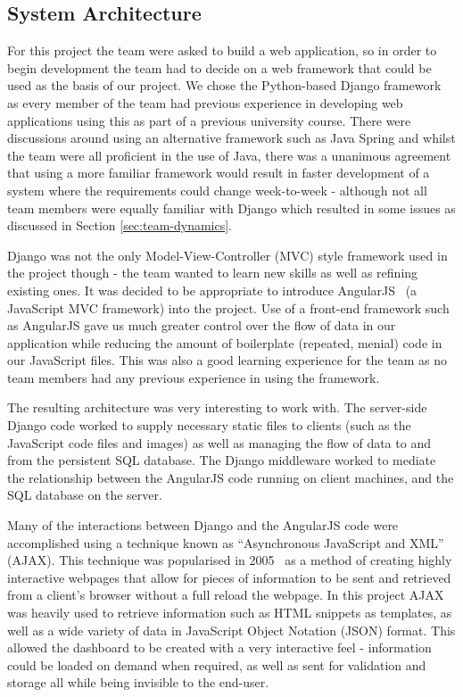 \documentclass{l3proj}
\begin{document}
\subsection{System Architecture}
\label{sec:system-implementation:system-architecture}

For this project the team were asked to build a web application, so in order to begin development the team had to decide on a web framework that could be used as the basis of our project. We chose the Python-based Django framework~\cite{Django} as every member of the team had previous experience in developing web applications using this as part of a previous university course. There were discussions around using an alternative framework such as Java Spring and whilst the team were all proficient in the use of Java, there was a unanimous agreement that using a more familiar framework would result in faster development of a system where the requirements could change week-to-week - although not all team members were equally familiar with Django which resulted in some issues as discussed in Section \ref{sec:team-dynamics}.

Django was not the only Model-View-Controller (MVC) style framework used in the project though - the team wanted to learn new skills as well as refining existing ones. It was decided to be appropriate to introduce AngularJS~\cite{AngularWebpage} (a JavaScript MVC framework) into the project. Use of a front-end framework such as AngularJS gave us much greater control over the flow of data in our application while reducing the amount of boilerplate (repeated, menial) code in our JavaScript files. This was also a good learning experience for the team as no team members had any previous experience in using the framework.

The resulting architecture was very interesting to work with. The server-side Django code worked to supply necessary static files to clients (such as the JavaScript code files and images) as well as managing the flow of data to and from the persistent SQL database. The Django middleware worked to mediate the relationship between the AngularJS code running on client machines, and the SQL database on the server.

Many of the interactions between Django and the AngularJS code were accomplished using a technique known as ``Asynchronous JavaScript and XML'' (AJAX). This technique was popularised in 2005~\cite{ANewApproachToWebApplications, W3CAjaxProposal} as a method of creating highly interactive webpages that allow for pieces of information to be sent and retrieved from a client's browser without a full reload the webpage. In this project AJAX was heavily used to retrieve information such as HTML snippets as templates, as well as a wide variety of data in JavaScript Object Notation (JSON) format. This allowed the dashboard to be created with a very interactive feel - information could be loaded on demand when required, as well as sent for validation and storage all while being invisible to the end-user.
\end{document}
